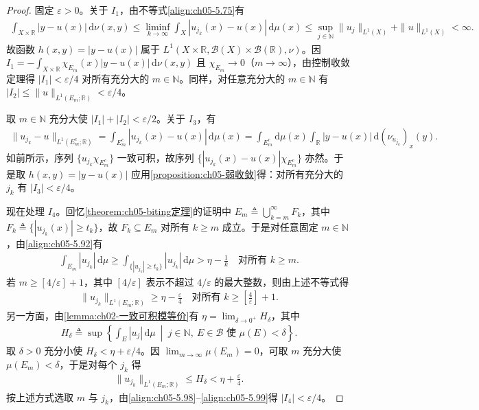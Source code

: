 \documentclass[../../main.tex]{subfiles}
\begin{document}
\begin{proof}
固定 $\varepsilon>0$。关于 $I_1$，由不等式\eqref{align:ch05-5.75}有
\begin{align*}
\int_{X\times\mathbb{R}}|y-u(x)|\,\mathrm{d}\nu(x,y)
\leqslant\liminf_{k\to\infty}\int_X|u_{j_k}(x)-u(x)|\,\mathrm{d}\mu(x)
\leqslant\sup_{j\in\mathbb{N}}\|u_j\|_{L^1(X)}+\|u\|_{L^1(X)}<\infty.
\end{align*}
故函数 $h(x,y)=|y-u(x)|$ 属于 $L^1(X\times\mathbb{R},\mathscr{B}(X)\times\mathscr{B}(\mathbb{R}),\nu)$。因 $I_1=-\int_{X\times\mathbb{R}}\chi_{E_m}(x)|y-u(x)|\,\mathrm{d}\nu(x,y)$ 且 $\chi_{E_m}\to0$（$m\to\infty$），由控制收敛定理得 $|I_1|<\varepsilon/4$ 对所有充分大的 $m\in\mathbb{N}$。同样，对任意充分大的 $m\in\mathbb{N}$ 有 $|I_2|\leqslant\|u\|_{L^1(E_m;\mathbb{R})}<\varepsilon/4$。

取 $m\in\mathbb{N}$ 充分大使 $|I_1|+|I_2|<\varepsilon/2$。关于 $I_3$，有
\begin{align*}
\|u_{j_k}-u\|_{L^1(E_m^c;\mathbb{R})}
=\int_{E_m^c}|u_{j_k}(x)-u(x)|\,\mathrm{d}\mu(x)
=\int_{E_m^c}\mathrm{d}\mu(x)\int_{\mathbb{R}}|y-u(x)|\,\mathrm{d}(\nu_{u_{j_k}})_x(y).
\end{align*}
如前所示，序列 $\{u_{j_k}\chi_{E_m^c}\}$ 一致可积，故序列 $\{|u_{j_k}(x)-u(x)|\chi_{E_m^c}\}$ 亦然。于是取 $h(x,y)=|y-u(x)|$ 应用\cref{proposition:ch05-弱收敛}得：对所有充分大的 $j_k$ 有 $|I_3|<\varepsilon/4$。

现在处理 $I_4$。回忆\cref{theorem:ch05-biting定理}的证明中 $E_m\triangleq\bigcup_{k=m}^\infty F_k$，其中 $F_k\triangleq\{|u_{j_k}(x)|\geqslant t_k\}$，故 $F_k\subseteq E_m$ 对所有 $k\geqslant m$ 成立。于是对任意固定 $m\in\mathbb{N}$，由\eqref{align:ch05-5.92}有
\begin{align*}
\int_{E_m}|u_{j_k}|\,\mathrm{d}\mu\geqslant\int_{\{|u_{j_k}|\geqslant t_k\}}|u_{j_k}|\,\mathrm{d}\mu>\eta-\frac1k
\quad\text{对所有 }k\geqslant m.
\end{align*}
若 $m\geqslant[4/\varepsilon]+1$，其中 $[4/\varepsilon]$ 表示不超过 $4/\varepsilon$ 的最大整数，则由上述不等式得
\begin{align}
\|u_{j_k}\|_{L^1(E_m;\mathbb{R})}\geqslant\eta-\frac{\varepsilon}{4}
\quad\text{对所有 }k\geqslant\left[\frac4\varepsilon\right]+1.\label{align:ch05-5.98}
\end{align}
另一方面，由\cref{lemma:ch02-一致可积模等价}有 $\eta=\lim_{\delta\to0^+}H_\delta$，其中
\begin{align*}
H_\delta\triangleq\sup\left\{\int_E|u_j|\,\mathrm{d}\mu\ \middle|\ j\in\mathbb{N},\ E\in\mathscr{B}\text{ 使 }\mu(E)<\delta\right\}.
\end{align*}
取 $\delta>0$ 充分小使 $H_\delta<\eta+\varepsilon/4$。因 $\lim_{m\to\infty}\mu(E_m)=0$，可取 $m$ 充分大使 $\mu(E_m)<\delta$，于是对每个 $j_k$ 得
\begin{align}
\|u_{j_k}\|_{L^1(E_m;\mathbb{R})}\leqslant H_\delta<\eta+\frac{\varepsilon}{4}.\label{align:ch05-5.99}
\end{align}
按上述方式选取 $m$ 与 $j_k$，由\eqref{align:ch05-5.98}--\eqref{align:ch05-5.99}得 $|I_4|<\varepsilon/4$。


\end{proof}
\end{document}
